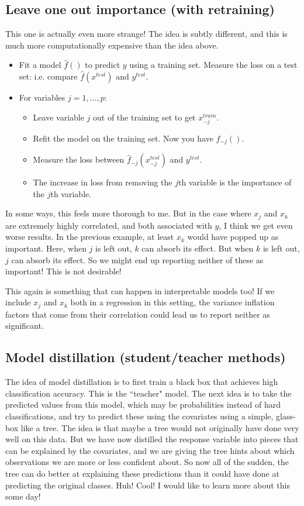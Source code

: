 \subsection{Leave one out importance (with retraining)}

This one is actually even more strange! The idea is subtly different, and this is much more computationally expensive than the idea above.

\begin{itemize}
\item Fit a model $\hat{f}()$ to predict $y$ using a training set. Measure the loss on a test set: i.e. compare $\hat{f}(x^{test})$ and $y^{test}$.
\item For variables $j=1,\ldots,p$:
\begin{itemize}
\item Leave variable $j$ out of the training set to get $x^{train}_{-j}$.
\item Refit the model on the training set. Now you have $\hat{f}_{-j}()$. 
\item Measure the loss between $\hat{{f}}_{-j}({x}^{test}_{-j})$ and $y^{test}$. 
\item The increase in loss from removing the $j$th variable is the importance of the $j$th variable. 
\end{itemize}
\end{itemize}

In some ways, this feels more thorough to me. But in the case where $x_j$ and $x_k$ are extremely highly correlated, and both associated with $y$, I think we get even worse results. In the previous example, at least $x_k$ would have popped up as important. Here, when $j$ is left out, $k$ can absorb its effect. But when $k$ is left out, $j$ can absorb its effect. So we might end up reporting neither of these as important! This is not desirable! 

This again is something that can happen in interpretable models too! If we include $x_j$ and $x_k$ both in a regression in this setting, the variance inflation factors that come from their correlation could lead us to report neither as significant. 

\subsection{Model distillation (student/teacher methods)}

The idea of model distillation is to first train a black box that achieves high classification accuracy. This is the ``teacher" model. The next idea is to take the predicted values from this model, which may be probabilities instead of hard classifications, and try to predict these using the covariates using a simple, glass-box like a tree. The idea is that maybe a tree would not originally have done very well on this data. But we have now distilled the response variable into pieces that can be explained by the covariates, and we are giving the tree hints about which observations we are more or less confident about. So now all of the sudden, the tree can do better at explaining these predictions than it could have done at predicting the original classes. Huh! Cool! I would like to learn more about this some day!


